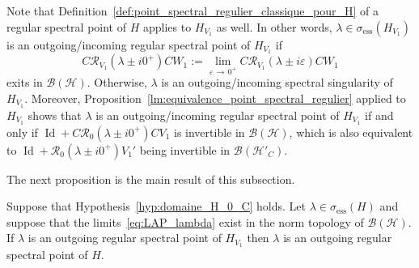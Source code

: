 \documentclass[10pt]{amsart}
\theoremstyle{definition}\newtheorem{defi}[theo]{Definition}\newtheorem{rema}[theo]{Remark}\newtheorem{exam}[theo]{Example}\newtheorem{exem}[theo]{Example}\newtheorem{nota}[theo]{Notation}
\newcommand{\Hi}{\mathcal{H}}
\newcommand{\ess}{\mathrm{ess}}
\newcommand{\Res}{\mathcal{R}}
\newcommand{\clB}{\mathcal{B}}
\DeclareMathOperator{\Id}{Id}
\begin{document}
Note that Definition~\ref{def:point_spectral_regulier_classique_pour_H} of a regular spectral point of $H$ applies to $H_{V_1}$ as well. In other words, $\lambda\in\sigma_{\ess}(H_{V_1})$ is an outgoing/incoming regular spectral point of $H_{V_1}$ if
\begin{equation*}
C\Res_{V_1}\left(\lambda\pm i0^+\right)CW_1:=\lim_{\varepsilon\,\rightarrow\,0^+}C\Res_{V_1}(\lambda\pm i\varepsilon)CW_1
\end{equation*}
exits in $\clB(\Hi)$. Otherwise, $\lambda$ is an outgoing/incoming spectral singularity of $H_{V_1}$. Moreover, Proposition~\ref{lm:equivalence_point_spectral_regulier} applied to $H_{V_1}$ shows that $\lambda$ is an outgoing/incoming regular spectral point of $H_{V_1}$ if and only if $\Id+C\Res_0(\lambda\pm i0^+)CV_1$ is invertible in $\clB(\Hi)$, which is also equivalent to $\Id+\Res_0(\lambda\pm i0^+)V_1'$ being invertible in $\clB(\Hi'_C)$.

The next proposition is the main result of this subsection.



\begin{prop}\label{prop:no_spectr_sing_diss}
Suppose that Hypothesis~\ref{hyp:domaine_H_0_C} holds. Let $\lambda\in\sigma_\ess(H)$ and suppose that the limits~\eqref{eq:LAP_lambda} exist in the norm topology of $\clB(\Hi)$. If $\lambda$ is an outgoing regular spectral point of $H_{V_1}$ then $\lambda$ is an outgoing regular spectral point of $H$.
\end{prop}
\end{document}
